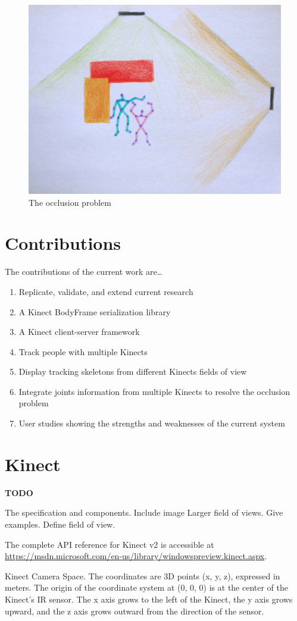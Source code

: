 \begin{figure}[!h]
  \centering
  \includegraphics[width=0.8\linewidth]{figs/occlusion_problem}
  \caption{The occlusion problem}
  \label{fig:occlusion_problem}
\end{figure}

\section{Contributions}
\label{sec:introduction_contributions}

The contributions of the current work are\ldots

\begin{enumerate}
  \item Replicate, validate, and extend current research
  \item A Kinect BodyFrame serialization library
  \item A Kinect client-server framework
  \item Track people with multiple Kinects
  \item Display tracking skeletons from different Kinects fields of view
  \item Integrate joints information from multiple Kinects to resolve the occlusion problem
  \item User studies showing the strengths and weaknesses of the current system
\end{enumerate}

\section{Kinect}
\label{sec:introduction_kinect}

\textbf{TODO}

The specification and components. Include image Larger field of views. Give examples. Define field of view.

The complete API reference for Kinect v2 is accessible at {\url{https://msdn.microsoft.com/en-us/library/windowspreview.kinect.aspx}}.

Kinect Camera Space. The coordinates are 3D points (x, y, z), expressed in meters. The origin of the coordinate system at (0, 0, 0) is at the center of the Kinect's IR sensor. The x axis grows to the left of the Kinect, the y axis grows upward, and the z axis grows outward from the direction of the sensor.


